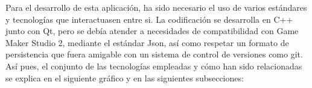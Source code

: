 Para el desarrollo de esta aplicación, ha sido necesario el uso de varios estándares y tecnologías que interactuasen entre si. La codificación se desarrolla en C++ junto con Qt, pero se debía atender a necesidades de compatibilidad con Game Maker Studio 2, mediante el estándar Json, así como respetar un formato de persistencia que fuera amigable con un sistema de control de versiones como git.
Así pues, el conjunto de las tecnologías empleadas y cómo han sido relacionadas se explica en el siguiente gráfico y en las siguientes subsecciones:
